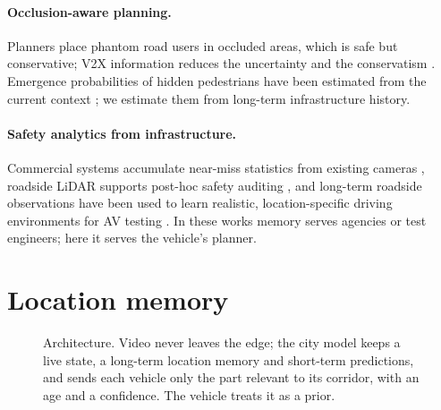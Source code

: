 \documentclass[11pt,a4paper]{article}
\begin{document}
\paragraph{Occlusion-aware planning.}
Planners place phantom road users in occluded areas, which is safe but conservative; V2X information reduces the uncertainty and the conservatism \citep{zhang2024occlusion}. Emergence probabilities of hidden pedestrians have been estimated from the current context \citep{koc2021emergence}; we estimate them from long-term infrastructure history.

\paragraph{Safety analytics from infrastructure.}
Commercial systems accumulate near-miss statistics from existing cameras \citep{derq_insight}, roadside LiDAR supports post-hoc safety auditing \citep{shang2026auditing}, and long-term roadside observations have been used to learn realistic, location-specific driving environments for AV testing \citep{yan2023neuralnde}. In these works memory serves agencies or test engineers; here it serves the vehicle's planner.

\section{Location memory}
\label{sec:memory}

\begin{figure}[t]
\centering
{}
\caption{Architecture. Video never leaves the edge; the city model keeps a live state, a long-term location memory and short-term predictions, and sends each vehicle only the part relevant to its corridor, with an age and a confidence. The vehicle treats it as a prior.}
\label{fig:arch}
\end{figure}
\end{document}

